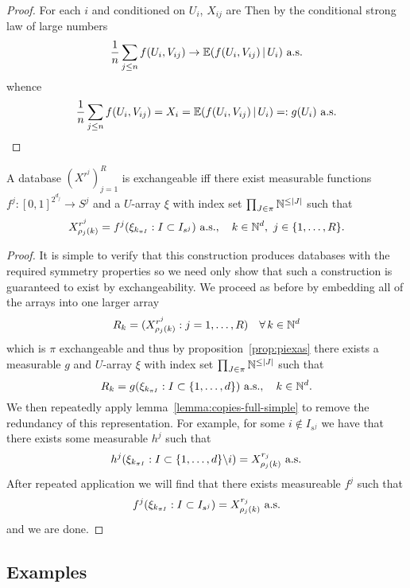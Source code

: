 \begin{proof}
  For each $i$ and conditioned on $U_i$, ${X}_{ij}$ are \iid
  Then by the conditional strong law of large numbers
  \[
    \frac{1}{n}\sum_{j \leq n} f(U_i, V_{ij}) \to \mathbb{E}(f(U_i, V_{ij})\,|\, U_i) \,\, \textrm{a.s.}
  \]
  whence
  \[
    \frac{1}{n}\sum_{j \leq n} f(U_i, V_{ij}) = X_i = \mathbb{E}(f(U_i, V_{ij})\,|\, U_i) =: g(U_i) \,\, \textrm{a.s.}
  \]
\end{proof}

\begin{thm}
  \label{thm:as-database}
  A database $(X^{r^j})_{j=1}^R$ is exchangeable iff there exist measurable functions $f^j : [0,1]^{2^{d_j}} \to S^j$ and a $U$-array $\xi$ with index set $\prod_{J\in\pi} \mathbb{N}^{\leq |J|}$ such that
  \begin{equation}
    X_{\rho_j(k)}^{r^j} = f^j(\xi_{k_{\pi I}} : I \subset I_{s^j}) \ \as, \quad k \in \Nats^d, \ j \in \{1,\ldots,R\}.
  \end{equation}
\end{thm}

\begin{proof}
  It is simple to verify that this construction produces databases with the required symmetry properties so we need only show that such a construction is guaranteed to exist by exchangeability.
  We proceed as before by embedding all of the arrays into one larger array
  \[
    R_{k} = (X^{r^j}_{\rho_j(k)} : j = 1,\dots,R) \quad \forall \, k \in \mathbb{N}^d
  \]
  which is $\pi$ exchangeable and thus by proposition~\ref{prop:piexas} there exists a measurable $g$ and $U$-array $\xi$ with index set $\prod_{J\in\pi} \mathbb{N}^{\leq |J|}$ such that
  \[
    R_{k} = g(\xi_{k_{\pi I}} : I \subset \{1,\ldots,d\}) \ \textrm{a.s.}, \quad k \in \mathbb{N}^d.
  \]
  We then repeatedly apply lemma~\ref{lemma:copies-full-simple} to remove the redundancy of this representation.
  For example, for some $i \notin I_{s^j}$ we have that there exists some measurable $h^j$ such that
  \[
    h^j(\xi_{k_{\pi I}} : I \subset \{1,\ldots,d\} \backslash i) = X^{r_j}_{\rho_j(k)} \ \textrm{a.s.}
  \]
  After repeated application we will find that there exists measureable $f^j$ such that
  \[
    f^j(\xi_{k_{\pi I}} : I \subset I_{s^j}) = X^{r_j}_{\rho_j(k)} \ \textrm{a.s.}
  \]
  and we are done.
\end{proof}

\subsection{Examples}

